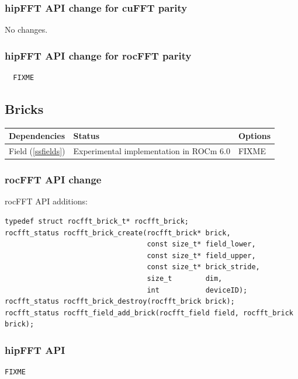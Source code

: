 \documentclass[12pt]{article}
\renewcommand{\(}{\left(}
\renewcommand{\)}{\right)}
\begin{document}
\subsubsection{hipFFT API change for cuFFT parity}

No changes.

\subsubsection{hipFFT API change for rocFFT parity}
\begin{lstlisting}
  FIXME
\end{lstlisting}


\newpage
\subsection{Bricks}
\label{ssbricks}


\begin{center}
  \begin{tabular}{|l|l|l|}
    \hline
    Dependencies & Status & Options \\
    \hline
    Field (\ref{ssfields}) & Experimental implementation in ROCm 6.0  & FIXME \\
    \hline
  \end{tabular}
\end{center}


\subsubsection{rocFFT API change}
rocFFT API additions:
\begin{lstlisting}
typedef struct rocfft_brick_t* rocfft_brick;
rocfft_status rocfft_brick_create(rocfft_brick* brick,
                                  const size_t* field_lower,
                                  const size_t* field_upper,
                                  const size_t* brick_stride,
                                  size_t        dim,
                                  int           deviceID);
rocfft_status rocfft_brick_destroy(rocfft_brick brick);
rocfft_status rocfft_field_add_brick(rocfft_field field, rocfft_brick brick);
\end{lstlisting}

\subsubsection{hipFFT API }
\begin{lstlisting}
FIXME
\end{lstlisting}
\end{document}
